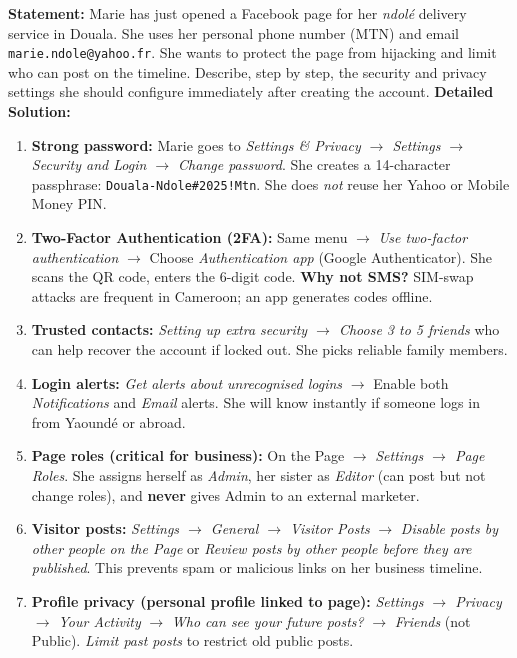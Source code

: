 \documentclass[11pt]{article}
\begin{document}
\begin{exoresolu}
    \textbf{Statement:} Marie has just opened a Facebook page for her \emph{ndolé} delivery service in Douala. She uses her personal phone number (MTN) and email \texttt{marie.ndole@yahoo.fr}. She wants to protect the page from hijacking and limit who can post on the timeline. Describe, step by step, the security and privacy settings she should configure immediately after creating the account.
    \tcblower
    \textbf{Detailed Solution:}
    \begin{enumerate}
        \item \textbf{Strong password:} Marie goes to \textit{Settings \& Privacy $\rightarrow$ Settings $\rightarrow$ Security and Login $\rightarrow$ Change password}. She creates a 14-character passphrase: \texttt{Douala-Ndole\#2025!Mtn}. She does \emph{not} reuse her Yahoo or Mobile Money PIN.
        \item \textbf{Two-Factor Authentication (2FA):} Same menu $\rightarrow$ \textit{Use two-factor authentication} $\rightarrow$ Choose \textit{Authentication app} (Google Authenticator). She scans the QR code, enters the 6-digit code. \textbf{Why not SMS?} SIM-swap attacks are frequent in Cameroon; an app generates codes offline.
        \item \textbf{Trusted contacts:} \textit{Setting up extra security $\rightarrow$ Choose 3 to 5 friends} who can help recover the account if locked out. She picks reliable family members.
        \item \textbf{Login alerts:} \textit{Get alerts about unrecognised logins} $\rightarrow$ Enable both \textit{Notifications} and \textit{Email} alerts. She will know instantly if someone logs in from Yaoundé or abroad.
        \item \textbf{Page roles (critical for business):} On the Page $\rightarrow$ \textit{Settings $\rightarrow$ Page Roles}. She assigns herself as \textit{Admin}, her sister as \textit{Editor} (can post but not change roles), and \textbf{never} gives Admin to an external marketer.
        \item \textbf{Visitor posts:} \textit{Settings $\rightarrow$ General $\rightarrow$ Visitor Posts} $\rightarrow$ \textit{Disable posts by other people on the Page} or \textit{Review posts by other people before they are published}. This prevents spam or malicious links on her business timeline.
        \item \textbf{Profile privacy (personal profile linked to page):} \textit{Settings $\rightarrow$ Privacy $\rightarrow$ Your Activity} $\rightarrow$ \textit{Who can see your future posts?} $\rightarrow$ \textit{Friends} (not Public). \textit{Limit past posts} to restrict old public posts.

\end{enumerate}
\end{exoresolu}
\end{document}
